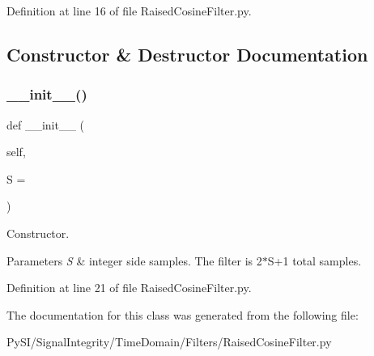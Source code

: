 Definition at line 16 of file Raised\+Cosine\+Filter.\+py.



\subsection{Constructor \& Destructor Documentation}
\mbox{\label{classSignalIntegrity_1_1TimeDomain_1_1Filters_1_1RaisedCosineFilter_1_1RaisedCosineFilter_a59c1eb244c4627d0d84564a3dffb5687}} 
\subsubsection{\texorpdfstring{\+\_\+\+\_\+init\+\_\+\+\_\+()}{\_\_init\_\_()}}
{\footnotesize\ttfamily def \+\_\+\+\_\+init\+\_\+\+\_\+ (\begin{DoxyParamCaption}\item[{}]{self,  }\item[{}]{S = {} }\end{DoxyParamCaption})}



Constructor. 


\begin{DoxyParams}{Parameters}
{\em S} & integer side samples. The filter is 2$\ast$\+S+1 total samples. \\
\hline
\end{DoxyParams}


Definition at line 21 of file Raised\+Cosine\+Filter.\+py.



The documentation for this class was generated from the following file\+:\begin{DoxyCompactItemize}
\item 
Py\+S\+I/\+Signal\+Integrity/\+Time\+Domain/\+Filters/Raised\+Cosine\+Filter.\+py\end{DoxyCompactItemize}
